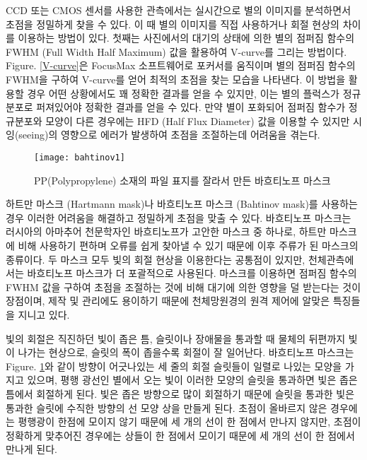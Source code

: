CCD 또는 CMOS 센서를 사용한 관측에서는 실시간으로 별의 이미지를 분석하면서 초점을 정밀하게 찾을 수 있다. 이 때 별의 이미지를 직접 사용하거나 회절 현상의 차이를 이용하는 방법이 있다.
첫째는 사진에서의 대기의 상태에 의한 별의 점퍼짐 함수의 FWHM (Full Width Half Maximum) 값을 활용하여 V-curve를 그리는 방법이다. \textrm{Figure}. \ref{V-curve}은 FocusMax 소프트웨어로 포커서를 움직이며 별의 점퍼짐 함수의 FWHM을 구하여 V-curve를 얻어 최적의 초점을 찾는 모습을 나타낸다. 이 방법을 활용할 경우 어떤 상황에서도 꽤 정확한 결과를 얻을 수 있지만, 이는 별의 플럭스가 정규분포로 퍼져있어야 정확한 결과를 얻을 수 있다. 만약 별이 포화되어 점퍼짐 함수가 정규분포와 모양이 다른 경우에는 HFD (Half Flux Diameter) 값을 이용할 수 있지만 시잉(seeing)의 영향으로 에러가 발생하여 초점을 조절하는데 어려움을 겪는다. 

\begin{figure}[h]
	\begin{center}
		\texttt{[image: bahtinov1]}
	\end{center}
	\caption{PP(Polypropylene) 소재의 파일 표지를 잘라서 만든 바흐티노프 마스크}
	\label{bahtinov}
\end{figure}

하트만 마스크 (Hartmann mask)나 바흐티노프 마스크 (Bahtinov mask)를 사용하는 경우 이러한 어려움을 해결하고 정밀하게 초점을 맞출 수 있다. 바흐티노프 마스크는 러시아의 아마추어 천문학자인 바흐티노프가 고안한 마스크 중 하나로, 하트만 마스크에 비해 사용하기 편하며 오류를 쉽게 찾아낼 수 있기 때문에 이후 주류가 된 마스크의 종류이다. 두 마스크 모두 빛의 회절 현상을 이용한다는 공통점이 있지만, 천체관측에서는 바흐티노프 마스크가 더 포괄적으로 사용된다. 마스크를 이용하면 점퍼짐 함수의 FWHM 값을 구하여 초점을 조절하는 것에 비해 대기에 의한 영향을 덜 받는다는 것이 장점이며, 제작 및 관리에도 용이하기 때문에 천체망원경의 원격 제어에 알맞은 특징들을 지니고 있다. 

빛의 회절은 직진하던 빛이 좁은 틈, 슬릿이나 장애물을 통과할 때 물체의 뒤편까지 빛이 나가는 현상으로, 슬릿의 폭이 좁을수록 회절이 잘 일어난다. 바흐티노프 마스크는 Figure. \ref{bahtinov}와 같이 방향이 어긋나있는 세 줄의 회절 슬릿들이 일렬로 나있는 모양을 가지고 있으며, 평행 광선인 별에서 오는 빛이 이러한 모양의 슬릿을 통과하면 빛은 좁은 틈에서 회절하게 된다. 빛은 좁은 방향으로 많이 회절하기 때문에 슬릿을 통과한 빛은 통과한 슬릿에 수직한 방향의 선 모양 상을 만들게 된다. 초점이 올바르지 않은 경우에는 평행광이 한점에 모이지 않기 때문에 세 개의 선이 한 점에서 만나지 않지만, 초점이 정확하게 맞추어진 경우에는 상들이 한 점에서 모이기 때문에 세 개의 선이 한 점에서 만나게 된다.

